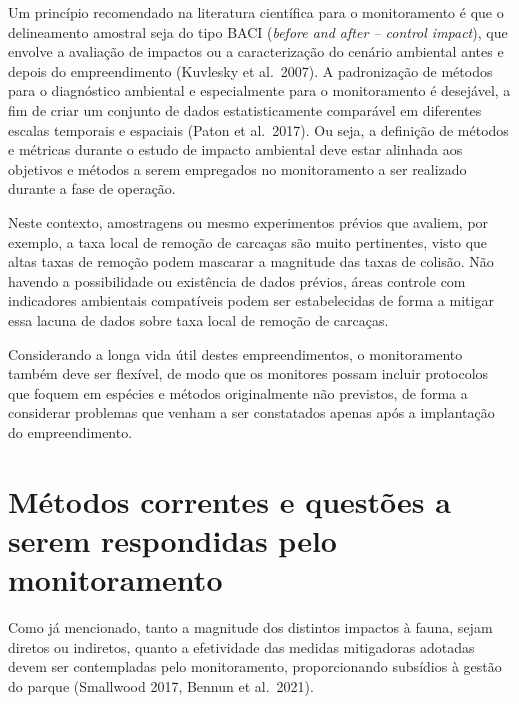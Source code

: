 \documentclass[
  oneside]{scrbook}
\begin{document}
Um princípio recomendado na literatura científica para o monitoramento é que o delineamento amostral seja do tipo BACI (\emph{before and after -- control impact}), que envolve a avaliação de impactos ou a caracterização do cenário ambiental antes e depois do empreendimento (Kuvlesky et al.~2007). A padronização de métodos para o diagnóstico ambiental e especialmente para o monitoramento é desejável, a fim de criar um conjunto de dados estatisticamente comparável em diferentes escalas temporais e espaciais (Paton et al.~2017). Ou seja, a definição de métodos e métricas durante o estudo de impacto ambiental deve estar alinhada aos objetivos e métodos a serem empregados no monitoramento a ser realizado durante a fase de operação.

Neste contexto, amostragens ou mesmo experimentos prévios que avaliem, por exemplo, a taxa local de remoção de carcaças são muito pertinentes, visto que altas taxas de remoção podem mascarar a magnitude das taxas de colisão. Não havendo a possibilidade ou existência de dados prévios, áreas controle com indicadores ambientais compatíveis podem ser estabelecidas de forma a mitigar essa lacuna de dados sobre taxa local de remoção de carcaças.

Considerando a longa vida útil destes empreendimentos, o monitoramento também deve ser flexível, de modo que os monitores possam incluir protocolos que foquem em espécies e métodos originalmente não previstos, de forma a considerar problemas que venham a ser constatados apenas após a implantação do empreendimento.

\hypertarget{muxe9todos-correntes-e-questuxf5es-a-serem-respondidas-pelo-monitoramento}{%
\section{Métodos correntes e questões a serem respondidas pelo monitoramento}\label{muxe9todos-correntes-e-questuxf5es-a-serem-respondidas-pelo-monitoramento}}

Como já mencionado, tanto a magnitude dos distintos impactos à fauna, sejam diretos ou indiretos, quanto a efetividade das medidas mitigadoras adotadas devem ser contempladas pelo monitoramento, proporcionando subsídios à gestão do parque (Smallwood 2017, Bennun et al.~2021).
\end{document}
